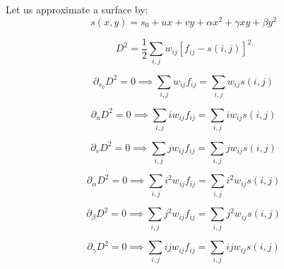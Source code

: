 \documentclass[aps,onecolumn]{revtex4}
\begin{document}
Let us approximate a surface by:
\begin{equation}
	s(x,y) = s_0+ u x + v y + \alpha x^2 + \gamma x y + \beta y^2
\end{equation}

\begin{equation}
	D^2 = \dfrac{1}{2} \sum_{i,j} w_{ij} \left[ f_{ij} - s(i,j) \right]^2
\end{equation}

\begin{equation}
	\partial_{s_0} D^2 = 0 \implies \sum_{i,j}  w_{ij} f_{ij} = \sum_{i,j} w_{ij} s(i,j)
\end{equation}

\begin{equation}
	\partial_{u} D^2 = 0 \implies \sum_{i,j} i w_{ij} f_{ij} = \sum_{i,j} i w_{ij} s(i,j)
\end{equation}

\begin{equation}
	\partial_{v} D^2 = 0 \implies \sum_{i,j} j w_{ij} f_{ij} = \sum_{i,j} j w_{ij} s(i,j)
\end{equation}

\begin{equation}
	\partial_{\alpha} D^2 = 0 \implies \sum_{i,j} i^2 w_{ij} f_{ij} = \sum_{i,j} i^2 w_{ij} s(i,j)
\end{equation}

\begin{equation}
	\partial_{\beta} D^2 = 0 \implies \sum_{i,j} j^2 w_{ij} f_{ij} = \sum_{i,j} j^2 w_{ij} s(i,j)
\end{equation}

\begin{equation}
	\partial_{\gamma} D^2 = 0 \implies \sum_{i,j} ij w_{ij} f_{ij} = \sum_{i,j} ij w_{ij} s(i,j)
\end{equation}
\end{document}
